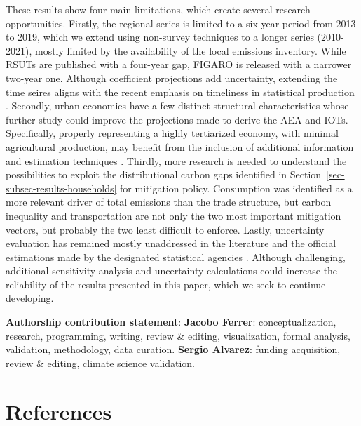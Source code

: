 \documentclass[
  10pt,
  twocolumn]{aft}
\begin{document}
These results show four main limitations, which create several research
opportunities. Firstly, the regional series is limited to a six-year
period from 2013 to 2019, which we extend using non-survey techniques to
a longer series (2010-2021), mostly limited by the availability of the
local emissions inventory. While RSUTs are published with a four-year
gap, FIGARO is released with a narrower two-year one. Although
coefficient projections add uncertainty, extending the time seires
aligns with the recent emphasis on timeliness in statistical production
\citep[p.~190]{oecdOECDHandbookCompilation2024}. Secondly, urban
economies have a few distinct structural characteristics whose further
study could improve the projections made to derive the AEA and IOTs.
Specifically, properly representing a highly tertiarized economy, with
minimal agricultural production, may benefit from the inclusion of
additional information and estimation techniques
\citep{zheng_entropy-based_2022}. Thirdly, more research is needed to
understand the possibilities to exploit the distributional carbon gaps
identified in Section~\ref{sec-subsec-results-households} for mitigation
policy. Consumption was identified as a more relevant driver of total
emissions than the trade structure, but carbon inequality and
transportation are not only the two most important mitigation vectors,
but probably the two least difficult to enforce. Lastly, uncertainty
evaluation has remained mostly unaddressed in the literature and the
official estimations made by the designated statistical agencies
\citep{eea_environmental_2013}. Although challenging, additional
sensitivity analysis and uncertainty calculations could increase the
reliability of the results presented in this paper, which we seek to
continue developing.

\textbf{Authorship contribution statement}: \textbf{Jacobo Ferrer}:
conceptualization, research, programming, writing, review \& editing,
visualization, formal analysis, validation, methodology, data curation.
\textbf{Sergio Alvarez}: funding acquisition, review \& editing, climate
science validation.

\newpage

\section*{References}\label{references}

\renewcommand{\bibsection}{}

\end{document}
